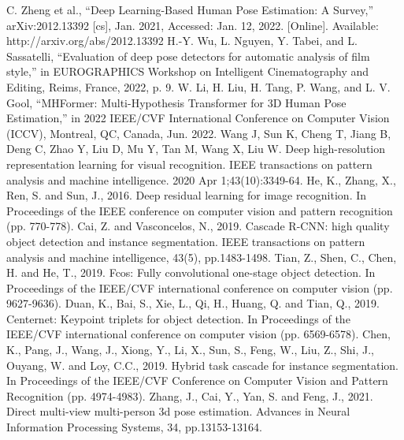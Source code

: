 \documentclass[runningheads]{llncs}
\begin{document}

\begin{thebibliography}{8}
   C. Zheng et al., “Deep Learning-Based Human Pose Estimation: A Survey,” arXiv:2012.13392 [cs], Jan. 2021, Accessed: Jan. 12, 2022. [Online]. Available: http://arxiv.org/abs/2012.13392
   H.-Y. Wu, L. Nguyen, Y. Tabei, and L. Sassatelli, “Evaluation of deep pose detectors for automatic analysis of film style,” in EUROGRAPHICS Workshop on Intelligent Cinematography and Editing, Reims, France, 2022, p. 9.
   W. Li, H. Liu, H. Tang, P. Wang, and L. V. Gool, “MHFormer: Multi-Hypothesis Transformer for 3D Human Pose Estimation,” in 2022 IEEE/CVF International Conference on Computer Vision (ICCV), Montreal, QC, Canada, Jun. 2022.
   Wang J, Sun K, Cheng T, Jiang B, Deng C, Zhao Y, Liu D, Mu Y, Tan M, Wang X, Liu W. Deep high-resolution representation learning for visual recognition. IEEE transactions on pattern analysis and machine intelligence. 2020 Apr 1;43(10):3349-64.
   He, K., Zhang, X., Ren, S. and Sun, J., 2016. Deep residual learning for image recognition. In Proceedings of the IEEE conference on computer vision and pattern recognition (pp. 770-778).
   Cai, Z. and Vasconcelos, N., 2019. Cascade R-CNN: high quality object detection and instance segmentation. IEEE transactions on pattern analysis and machine intelligence, 43(5), pp.1483-1498.
   Tian, Z., Shen, C., Chen, H. and He, T., 2019. Fcos: Fully convolutional one-stage object detection. In Proceedings of the IEEE/CVF international conference on computer vision (pp. 9627-9636).
   Duan, K., Bai, S., Xie, L., Qi, H., Huang, Q. and Tian, Q., 2019. Centernet: Keypoint triplets for object detection. In Proceedings of the IEEE/CVF international conference on computer vision (pp. 6569-6578).
   Chen, K., Pang, J., Wang, J., Xiong, Y., Li, X., Sun, S., Feng, W., Liu, Z., Shi, J., Ouyang, W. and Loy, C.C., 2019. Hybrid task cascade for instance segmentation. In Proceedings of the IEEE/CVF Conference on Computer Vision and Pattern Recognition (pp. 4974-4983).
   Zhang, J., Cai, Y., Yan, S. and Feng, J., 2021. Direct multi-view multi-person 3d pose estimation. Advances in Neural Information Processing Systems, 34, pp.13153-13164.
\end{thebibliography}
\end{document}

